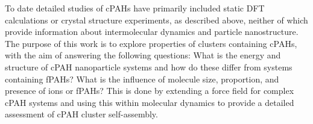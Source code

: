 %

To date detailed studies of cPAHs have primarily included static DFT calculations or crystal structure experiments, as described above, neither of which provide information about intermolecular dynamics and particle nanostructure.
%
%
The purpose of this work is to explore properties of clusters containing cPAHs, with the aim of answering the following questions: What is the energy and structure of cPAH nanoparticle systems and how do these differ from systems containing fPAHs? What is the influence of molecule size, proportion, and presence of ions or fPAHs? This is done by extending a force field for complex cPAH systems and using this within molecular dynamics to provide a detailed assessment of cPAH cluster self-assembly.

